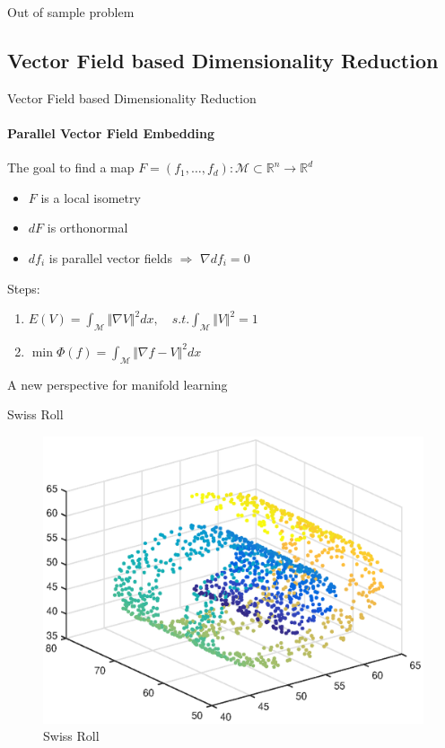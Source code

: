 \documentclass{beamer}
\begin{document}
\begin{darkframes}
\begin{frame}{Out of sample problem}
    \end{frame}
    
   \subsection{Vector Field based Dimensionality Reduction}
   \begin{frame}{Vector Field based Dimensionality Reduction}
   \framesubtitle{Parallel Vector Field Embedding}
   The goal to find a map $F=(f_1,\ldots,f_d) : \mathcal{M} \subset \mathbb{R}^n \to \mathbb{R}^d$
   \begin{itemize}
   	\item $F$ is a local isometry
   	\item $dF$ is orthonormal
   	\item $df_i$ is parallel vector fields $\Rightarrow$ $\nabla df_i = 0$
   \end{itemize}
   Steps:
   \begin{enumerate}
   	\item $\displaystyle E(V) = \int_{\mathcal{M}}\Vert \nabla V \Vert^2dx,\quad  s.t. \int_{\mathcal{M}}\Vert V \Vert^2=1$
   	\item $\displaystyle\min\Phi(f) = \int_{\mathcal{M}}\Vert \nabla f - V \Vert^2dx$
   \end{enumerate}
   \alert{A new perspective for manifold learning}
	\end{frame}      
   
   \begin{frame}{Swiss Roll}
   \begin{figure}
   \centering
   \includegraphics[scale=0.5]{./figs/swiss.eps}
   \caption{Swiss Roll}
   \end{figure}
   \end{frame}
   

\end{darkframes}
\end{document}
